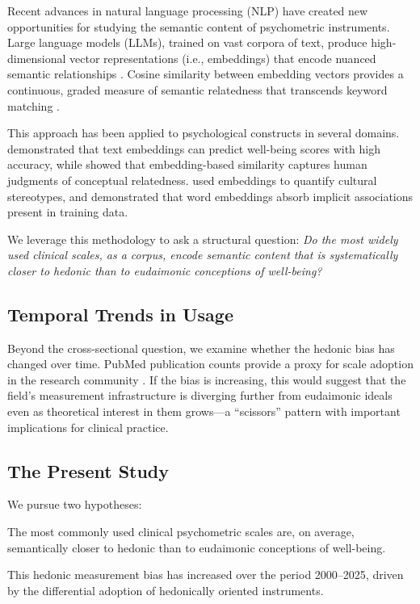 \documentclass[12pt,a4paper]{article}
\begin{document}
Recent advances in natural language processing (NLP) have created new opportunities for studying the semantic content of psychometric instruments.
Large language models (LLMs), trained on vast corpora of text, produce high-dimensional vector representations (i.e., embeddings) that encode nuanced semantic relationships
\citep{mikolov2013distributed, devlin2019bert, brown2020language}.
Cosine similarity between embedding vectors provides a continuous, graded measure of semantic relatedness that transcends keyword matching
\citep{pennington2014glove}.

This approach has been applied to psychological constructs in several domains.
\citet{kjell2023text} demonstrated that text embeddings can predict well-being scores with high accuracy, while
\citet{bhatia2019predicting} showed that embedding-based similarity captures human judgments of conceptual relatedness.
\citet{grand2022semantic} used embeddings to quantify cultural stereotypes, and
\citet{caliskan2017semantics} demonstrated that word embeddings absorb implicit associations present in training data.

We leverage this methodology to ask a structural question: \textit{Do the most widely used clinical scales, as a corpus, encode semantic content that is systematically closer to hedonic than to eudaimonic conceptions of well-being?}

\subsection{Temporal Trends in Usage}

Beyond the cross-sectional question, we examine whether the hedonic bias has changed over time.
PubMed publication counts provide a proxy for scale adoption in the research community
\citep{larsen2010rate, bornmann2015growth}.
If the bias is increasing, this would suggest that the field's measurement infrastructure is diverging further from eudaimonic ideals even as theoretical interest in them grows---a ``scissors'' pattern with important implications for clinical practice.

\subsection{The Present Study}

We pursue two hypotheses:
\begin{description}[style=nextline]
    \item[H1:] The most commonly used clinical psychometric scales are, on average, semantically closer to hedonic than to eudaimonic conceptions of well-being.
    \item[H2:] This hedonic measurement bias has increased over the period 2000--2025, driven by the differential adoption of hedonically oriented instruments.
\end{description}
\end{document}
